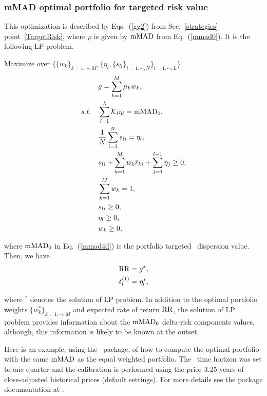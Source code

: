 \BackToContents

\subsubsection{mMAD optimal portfolio for targeted risk value}
This optimization is described by Eqs.~(\ref{gg2}) from Sec.~\ref{strategies} point~\ref{TargetRisk},
where $\rho$ is given by ${\rm mMAD}$ from Eq.\ (\ref{mmad0}).
It is the following LP problem.

\bigskip
\noindent Maximize over $\{ \{w_k\}_{k=1,\cdots,M}, \{ \eta_l, \{ s_{li} \}_{i=1,\cdots,N} \}_{l=1,\cdots,L} \}$
\begin{subequations}\label{mmad4}
\begin{align}
    &g = \sum_{k=1}^M \mu_k w_k, \label{mmad4a} \\
    \st &\sum_{l=1}^L\cK_l \eta_l = \mMAD_0, \label{mmad4d} \\
        &\frac{1}{N} \sum_{i=1}^N s_{li} = \eta_l, \label{mmad4b} \\
        &s_{li} + \sum_{k=1}^M w_k \br_{ki} + \sum_{j=1}^{l-1} \eta_j \geq 0, \label{mmad4c} \\
        &\sum_{k=1}^M w_k = 1, \label{mmad4e} \\
        & s_{li} \geq 0, \label{mmad4f} \\
        &\eta_l \geq 0, \label{mmad4h} \\
        & w_k \geq 0, \label{mmad4g}
\end{align}
\end{subequations}

\noindent where ${\rm mMAD}_0$ in Eq.~(\ref{mmad4d}) is the portfolio targeted \mMAD\ dispersion value.
Then, we have
\begin{subequations}\label{mmad5}
\begin{align}
    \RR &= g^*, \label{mmad5a} \\
    \delta^{(1)}_l &= \eta_l^*, \label{mmad5b}
\end{align}
\end{subequations}

\noindent where $^*$ denotes the solution of LP problem.
In addition to the optimal portfolio weights $\{w_k^*\}_{k=1,\cdots,M}$ and expected rate of return ${\rm RR}$,
the solution of LP problem provides information about the ${\rm mMAD}_0$ delta-risk components values,
although, this information is likely to be known at the outset.

\bigskip
\noindent Here is an example, using the \azapy\ package, of how to compute the optimal portfolio
with the same ${\rm mMAD}$ as the equal weighted portfolio.
The \mMAD\ time horizon was set to one quarter and the calibration is performed using the prior 3.25 years of
close-adjusted historical prices (default settings).
For more details see the package documentation at \azapydoc.

